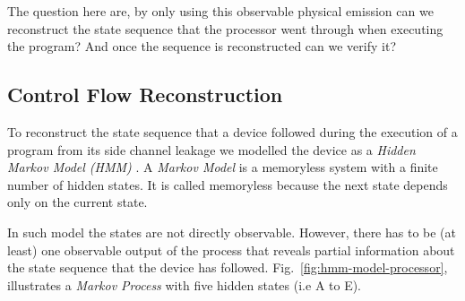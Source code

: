 \documentclass[lnicst]{svmultln}
\begin{document}
The question here are, by only using this observable physical emission can we reconstruct the state sequence that the processor went through when executing the program? And once the sequence is reconstructed can we verify it?

\subsection{Control Flow Reconstruction}
\label{subsec:reconstruction}

To reconstruct the state sequence that a device followed during the execution of a program from its side channel leakage we modelled the device as a \emph{Hidden Markov Model (HMM)} \cite{Book-08-F,IEEE-89-L}. A \emph{Markov Model} is a memoryless system with a finite number of hidden states. It is called memoryless because the next state depends only on the current state.

In such model the states are not directly observable. However, there has to be (at least) one observable output of the process that reveals partial information about the state sequence that the device has followed. Fig.~\ref{fig:hmm-model-processor}, illustrates a \emph{Markov Process} with five hidden states (i.e A to E).
\end{document}
